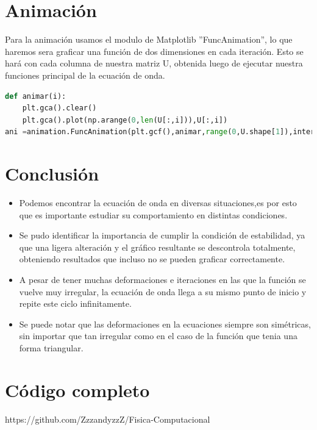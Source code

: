 \documentclass[letterpaper, 12 pt, conference]{ieeeconf}
\begin{document}
\section{Animación}
Para la animación usamos el modulo de Matplotlib ''FuncAnimation'', lo que haremos sera graficar una función de dos dimensiones en cada iteración. Esto se hará con cada columna de nuestra matriz U, obtenida luego de ejecutar nuestra funciones principal de la ecuación de onda.
\begin{lstlisting}[language=Python,caption=Animación]
def animar(i):
    plt.gca().clear()
    plt.gca().plot(np.arange(0,len(U[:,i])),U[:,i])
ani =animation.FuncAnimation(plt.gcf(),animar,range(0,U.shape[1]),interval=10,repeat_delay =1000)
\end{lstlisting}
\section{Conclusión}
\begin{itemize}
    \item Podemos encontrar la ecuación de onda en diversas situaciones,es por esto que es importante estudiar su comportamiento en distintas condiciones.
    \item Se pudo identificar la importancia de cumplir la condición de estabilidad, ya que una ligera alteración y el gráfico resultante se descontrola totalmente, obteniendo resultados que incluso no se pueden graficar correctamente.
    \item A pesar de tener muchas deformaciones e iteraciones en las que la función se vuelve muy irregular, la ecuación de onda llega a su mismo punto de inicio y repite este ciclo infinitamente.
    \item Se puede notar que las deformaciones en la ecuaciones siempre son simétricas, sin importar que tan irregular como en el caso de la función que tenia una forma triangular.
\end{itemize}
\section{Código completo}
https://github.com/ZzzandyzzZ/Fisica-Computacional
\end{document}
